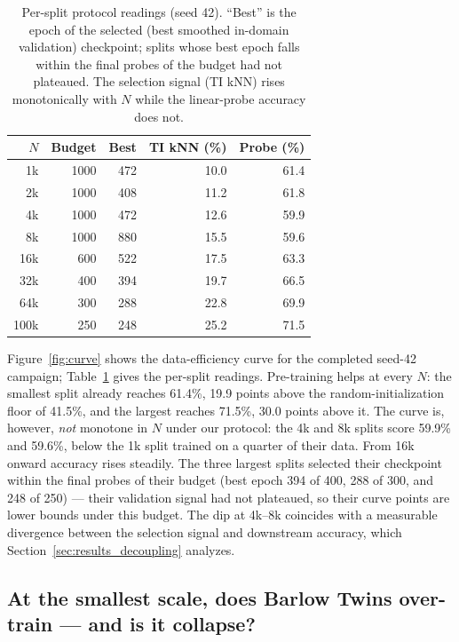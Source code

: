 \begin{table}[!t]
  \caption{Per-split protocol readings (seed 42). ``Best'' is the epoch of
  the selected (best smoothed in-domain validation) checkpoint; splits whose
  best epoch falls within the final probes of the budget had not plateaued.
  The selection signal (TI kNN) rises monotonically with $N$ while the
  linear-probe accuracy does not.}
  \label{tab:splits}
  \centering
  \begin{tabular}{rrrrr}
    \toprule
    $N$ & Budget & Best & TI kNN (\%) & Probe (\%) \\
    \midrule
    1k   & 1000 & 472 & 10.0 & 61.4 \\
    2k   & 1000 & 408 & 11.2 & 61.8 \\
    4k   & 1000 & 472 & 12.6 & 59.9 \\
    8k   & 1000 & 880 & 15.5 & 59.6 \\
    16k  & 600  & 522 & 17.5 & 63.3 \\
    32k  & 400  & 394 & 19.7 & 66.5 \\
    64k  & 300  & 288 & 22.8 & 69.9 \\
    100k & 250  & 248 & 25.2 & 71.5 \\
    \bottomrule
  \end{tabular}
\end{table}

Figure~\ref{fig:curve} shows the data-efficiency curve for the completed
seed-42 campaign; Table~\ref{tab:splits} gives the per-split readings.
Pre-training helps at every $N$: the smallest split already reaches 61.4\%,
19.9 points above the random-initialization floor of 41.5\%, and the largest
reaches 71.5\%, 30.0 points above it. The curve is, however, \emph{not}
monotone in $N$ under our protocol: the 4k and 8k splits score 59.9\% and
59.6\%, below the 1k split trained on a quarter of their data. From 16k
onward accuracy rises steadily. The three largest splits selected their
checkpoint within the final probes of their budget (best epoch 394 of 400,
288 of 300, and 248 of 250) --- their validation signal had not plateaued,
so their curve points are lower bounds under this budget. The dip at
4k--8k coincides with a measurable divergence between the selection signal
and downstream accuracy, which Section~\ref{sec:results_decoupling}
analyzes.

\subsection{At the smallest scale, does Barlow Twins over-train --- and is it collapse?}
\label{sec:results_overtraining}

